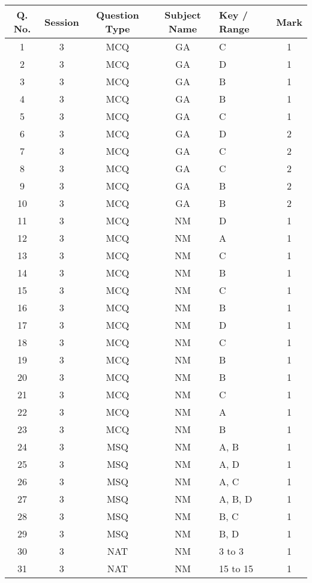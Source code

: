 \begin{tabular}[12pt]{|c|c|c|c|l|c|}
\hline
Q. No. & Session &  Question Type & Subject Name  & Key / Range & Mark \\
\hline

1  & 3 & MCQ & GA & C & 1 \\
\hline
2  & 3 & MCQ & GA & D & 1 \\
\hline
3  & 3 & MCQ & GA & B & 1 \\
\hline
4  & 3 & MCQ & GA & B & 1 \\
\hline
5  & 3 & MCQ & GA & C & 1 \\
\hline
6  & 3 & MCQ & GA & D & 2 \\
\hline
7  & 3 & MCQ & GA & C & 2 \\
\hline
8  & 3 & MCQ & GA & C & 2 \\
\hline
9  & 3 & MCQ & GA & B & 2 \\
\hline
10 & 3 & MCQ & GA & B & 2 \\
\hline
11 & 3 & MCQ & NM & D & 1 \\
\hline
12 & 3 & MCQ & NM & A & 1 \\
\hline
13 & 3 & MCQ & NM & C & 1 \\
\hline
14 & 3 & MCQ & NM & B & 1 \\
\hline
15 & 3 & MCQ & NM & C & 1 \\
\hline
16 & 3 & MCQ & NM & B & 1 \\
\hline
17 & 3 & MCQ & NM & D & 1 \\
\hline
18 & 3 & MCQ & NM & C & 1 \\
\hline
19 & 3 & MCQ & NM & B & 1 \\
\hline
20 & 3 & MCQ & NM & B & 1 \\
\hline
21 & 3 & MCQ & NM & C & 1 \\
\hline
22 & 3 & MCQ & NM & A & 1 \\
\hline
23 & 3 & MCQ & NM & B & 1 \\
\hline
24 & 3 & MSQ & NM & A, B & 1 \\
\hline
25 & 3 & MSQ & NM & A, D & 1 \\
\hline
26 & 3 & MSQ & NM & A, C & 1 \\
\hline
27 & 3 & MSQ & NM & A, B, D & 1 \\
\hline
28 & 3 & MSQ & NM & B, C & 1 \\
\hline
29 & 3 & MSQ & NM & B, D & 1 \\
\hline
30 & 3 & NAT & NM & 3 to 3 & 1 \\
\hline
31 & 3 & NAT & NM & 15 to 15 & 1 \\

\end{tabular}
